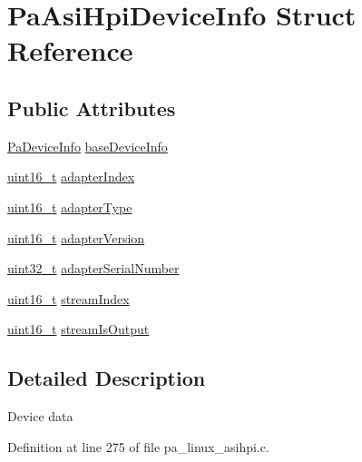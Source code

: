 \hypertarget{struct_pa_asi_hpi_device_info}{}\section{Pa\+Asi\+Hpi\+Device\+Info Struct Reference}
\label{struct_pa_asi_hpi_device_info}
\subsection*{Public Attributes}
\begin{DoxyCompactItemize}
\item 
\hyperlink{struct_pa_device_info}{Pa\+Device\+Info} \hyperlink{struct_pa_asi_hpi_device_info_a6901f154dd53fd482f1295154018cd13}{base\+Device\+Info}
\item 
\hyperlink{lib-src_2ffmpeg_2win32_2stdint_8h_a30af71eaf40c925c9832eb289a48da35}{uint16\+\_\+t} \hyperlink{struct_pa_asi_hpi_device_info_a262bff2b6846dd61e2cc0f8e6c696321}{adapter\+Index}
\item 
\hyperlink{lib-src_2ffmpeg_2win32_2stdint_8h_a30af71eaf40c925c9832eb289a48da35}{uint16\+\_\+t} \hyperlink{struct_pa_asi_hpi_device_info_af8c1c37195d84fc0e095e0f3bb3f26dc}{adapter\+Type}
\item 
\hyperlink{lib-src_2ffmpeg_2win32_2stdint_8h_a30af71eaf40c925c9832eb289a48da35}{uint16\+\_\+t} \hyperlink{struct_pa_asi_hpi_device_info_ae7f2d9b7af773915ce4b03d17638c4ae}{adapter\+Version}
\item 
\hyperlink{lib-src_2ffmpeg_2win32_2stdint_8h_a6eb1e68cc391dd753bc8ce896dbb8315}{uint32\+\_\+t} \hyperlink{struct_pa_asi_hpi_device_info_a6b08780c17503edb4f0724e2f803d7e8}{adapter\+Serial\+Number}
\item 
\hyperlink{lib-src_2ffmpeg_2win32_2stdint_8h_a30af71eaf40c925c9832eb289a48da35}{uint16\+\_\+t} \hyperlink{struct_pa_asi_hpi_device_info_afb6ffc3f50ee76abda0d9a816016ed59}{stream\+Index}
\item 
\hyperlink{lib-src_2ffmpeg_2win32_2stdint_8h_a30af71eaf40c925c9832eb289a48da35}{uint16\+\_\+t} \hyperlink{struct_pa_asi_hpi_device_info_a5385ddaea81f298997d672b01deacf22}{stream\+Is\+Output}
\end{DoxyCompactItemize}


\subsection{Detailed Description}
Device data 

Definition at line 275 of file pa\+\_\+linux\+\_\+asihpi.\+c.



